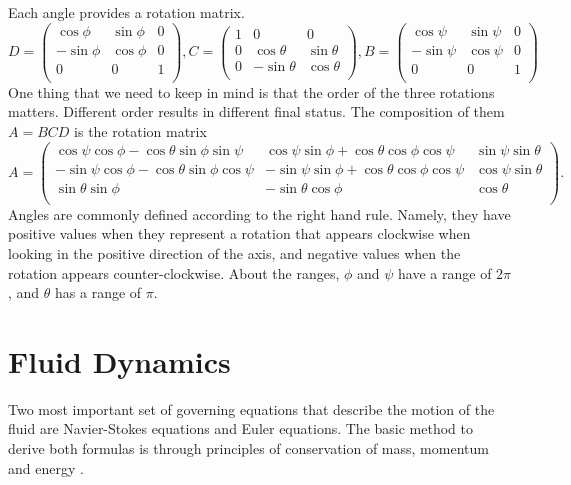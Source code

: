Each angle provides a rotation matrix.
\begin{equation}
D = \left(
    \begin{array}{ccc}
    \cos\phi & \sin\phi & 0 \\
    -\sin\phi & \cos\phi & 0 \\
    0 & 0 & 1 \\
    \end{array}
    \right),
C = \left(
    \begin{array}{ccc}
    1 & 0 & 0 \\
    0 & \cos\theta & \sin\theta \\
    0 & -\sin\theta & \cos\theta \\
    \end{array}
    \right),
B = \left(
    \begin{array}{ccc}
    \cos\psi & \sin\psi & 0 \\
    -\sin\psi & \cos\psi & 0 \\
    0 & 0 & 1 \\
    \end{array}
    \right)
\end{equation}
One thing that we need to keep in mind is that the order of the three 
rotations matters. Different order results in different final status. 
The composition of them $A=BCD$ is the rotation matrix
\begin{equation}
A = \left(
    \begin{array}{ccc}
    \cos\psi \cos\phi - \cos\theta \sin\phi \sin\psi & \cos\psi \sin\phi + \cos\theta \cos\phi \cos\psi & \sin\psi \sin \theta \\
    -\sin\psi \cos\phi - \cos\theta \sin\phi \cos\psi & -\sin \psi \sin\phi + \cos\theta \cos\phi \cos\psi & \cos\psi \sin\theta \\
    \sin\theta \sin\phi & -\sin\theta \cos\phi & \cos\theta \\
    \end{array}
    \right).
\label{eqn:rotation_matrix1}
\end{equation}
Angles are commonly defined according to the right hand rule. 
Namely, they have positive values when they represent a rotation that 
appears clockwise when looking in the positive direction of the axis, and 
negative values when the rotation appears counter-clockwise. 
About the ranges, $\phi$ and $\psi$ have a range of $2\pi$, and $\theta$ has 
a range of $\pi$. 



\section{Fluid Dynamics}
\label{Sec:FD}
Two most important set of governing equations that describe the motion 
of the fluid are Navier-Stokes equations and Euler equations. 
The basic method to derive both formulas is through principles of 
conservation of mass, momentum and energy
\cite{gonzalez2008continuum,lin1988mathapplied}.

